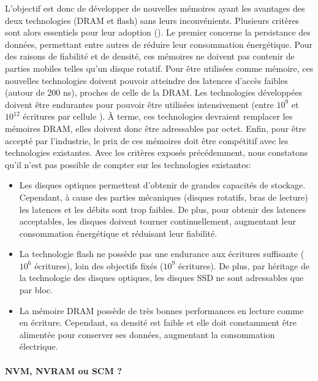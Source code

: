         L'objectif est donc de développer de nouvelles mémoires ayant les avantages des deux technologies (DRAM et flash) sans leurs inconvénients. Plusieurs critères sont alors essentiels pour leur adoption (\cite{Freitas2008}). Le premier  concerne la persistance des données, permettant entre autres de réduire leur consommation énergétique. Pour des raisons de fiabilité et de densité, ces mémoires ne doivent pas contenir de parties mobiles telles qu'un disque rotatif. Pour être utilisées comme mémoire, ces nouvelles technologies doivent pouvoir atteindre des latences d'accès faibles (autour de 200 ns\cite{IBM2013}), proches de celle de la DRAM. Les technologies développées doivent être endurantes pour pouvoir être utilisées intensivement (entre $10^9$ et $10^{12}$ écritures par cellule \cite{IBM2013}). À terme, ces technologies devraient remplacer les mémoires DRAM, elles doivent donc être adressables par octet. Enfin, pour être accepté par l'industrie, le prix de ces mémoires doit être compétitif avec les technologies existantes. Avec les critères exposés précédemment, nous constatons qu'il n'est pas possible de compter sur les technologies existantes:
        \begin{itemize}
            \item Les disques optiques permettent d'obtenir de grandes capacités de stockage. Cependant, à cause des parties mécaniques (disques rotatifs, bras de lecture) les latences et les débits sont trop faibles. De plus, pour obtenir des latences acceptables, les disques doivent tourner continuellement, augmentant leur consommation énergétique et réduisant leur fiabilité.
            \item La technologie flash ne possède pas une endurance aux écritures suffisante ($10^6$ écritures), loin des objectifs fixés ($10^9$ écritures). De plus, par héritage de la technologie des disques optiques, les disques SSD ne sont adressables que par bloc.
            \item La mémoire DRAM possède de très bonnes performances en lecture comme en écriture. Cependant, sa densité est faible et elle doit constamment être alimentée pour conserver ses données, augmentant la consommation électrique.
        \end{itemize}
  
        
    
        
        \paragraph{NVM, NVRAM ou SCM ?}
            
